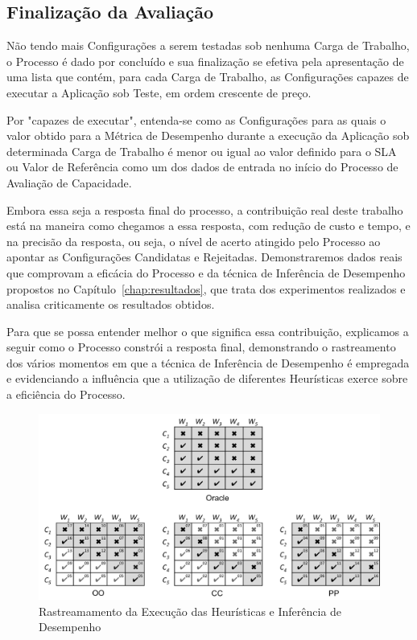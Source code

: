 \subsection{Finalização da Avaliação}
Não tendo mais Configurações a serem testadas sob nenhuma Carga de Trabalho, o 
Processo é dado por concluído e sua finalização se efetiva pela apresentação de uma
lista que contém, para cada Carga de Trabalho, as Configurações capazes de executar
a Aplicação sob Teste, em ordem crescente de preço.

Por "capazes de executar", entenda-se como as Configurações para as quais o valor
obtido para a Métrica de Desempenho durante a execução da Aplicação sob determinada
Carga de Trabalho é menor ou igual ao valor definido para o SLA ou Valor de Referência
como um dos dados de entrada no início do Processo de Avaliação de Capacidade.

Embora essa seja a resposta final do processo, a contribuição real deste trabalho está
na maneira como chegamos a essa resposta, com redução de custo e tempo, e na precisão 
da resposta, ou seja, o nível de acerto atingido pelo Processo ao apontar as Configurações
Candidatas e Rejeitadas. Demonstraremos dados reais que comprovam a eficácia do 
Processo e da técnica de Inferência de Desempenho propostos no Capítulo~\ref{chap:resultados},
que trata dos experimentos realizados e analisa criticamente os resultados obtidos.

Para que se possa entender melhor o que significa essa contribuição, explicamos a seguir
como o Processo constrói a resposta final, demonstrando o rastreamento dos vários momentos
em que a técnica de Inferência de Desempenho é empregada e evidenciando a influência que
a utilização de diferentes Heurísticas exerce sobre a eficiência do Processo.

\begin{figure}
  \caption{\label{fig:fig_processo_traces}Rastreamamento da Execução das Heurísticas e Inferência de Desempenho}
  \begin{center}
    \includegraphics[scale=0.6]{img/traces}
  \end{center}
\end{figure}

